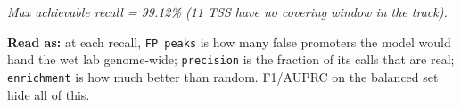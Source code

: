 \documentclass[10pt]{article}
\begin{document}
{\itshape Max achievable recall = 99.12\% (11 TSS have no covering window in the track).}

\textbf{Read as:} at each recall, \texttt{FP peaks} is how many false promoters the model would hand the wet lab genome-wide; \texttt{precision} is the fraction of its calls that are real; \texttt{enrichment} is how much better than random. F1/AUPRC on the balanced set hide all of this.
\end{document}
